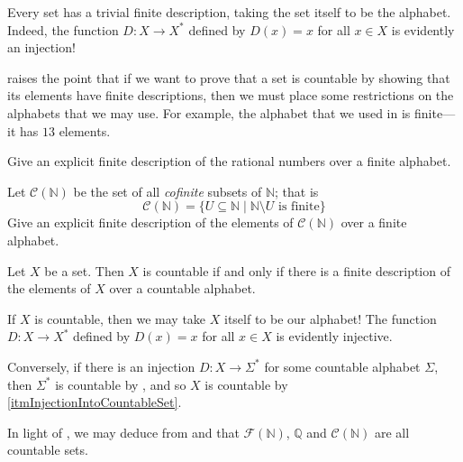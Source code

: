 \begin{example}
\label{exTrivialFiniteDescription}
Every set has a trivial finite description, taking the set itself to be the alphabet. Indeed, the function $D : X \to X^*$ defined by $D(x) = x$ for all $x \in X$ is evidently an injection!
\end{example}

 raises the point that if we want to prove that a set is countable by showing that its elements have finite descriptions, then we must place some restrictions on the alphabets that we may use. For example, the alphabet that we used in  is finite---it has $13$ elements.

\begin{exercise}
\label{exFiniteDescriptionOfQ}
Give an explicit finite description of the rational numbers over a finite alphabet.
\end{exercise}

\begin{exercise}
\label{exFiniteDescriptionOfCofiniteSubsetsOfN}
Let $\mathcal{C}(\mathbb{N})$ be the set of all \textit{cofinite} subsets of $\mathbb{N}$; that is
\[ \mathcal{C}(\mathbb{N}) = \{ U \subseteq \mathbb{N} \mid \mathbb{N} \setminus U \text{ is finite} \} \]
Give an explicit finite description of the elements of $\mathcal{C}(\mathbb{N})$ over a finite alphabet.
\end{exercise}

\begin{theorem}
\label{thmCountableIffFiniteDescription}
Let $X$ be a set. Then $X$ is countable if and only if there is a finite description of the elements of $X$ over a countable alphabet.
\end{theorem}

\begin{cproof}
If $X$ is countable, then we may take $X$ itself to be our alphabet! The function $D : X \to X^*$ defined by $D(x) = x$ for all $x \in X$ is evidently injective.

Conversely, if there is an injection $D : X \to \Sigma^*$ for some countable alphabet $\Sigma$, then $\Sigma^*$ is countable by , and so $X$ is countable by \ref{itmInjectionIntoCountableSet}.
\end{cproof}

\begin{example}
In light of , we may deduce from  and  that $\mathcal{F}(\mathbb{N})$, $\mathbb{Q}$ and $\mathcal{C}(\mathbb{N})$ are all countable sets.
\end{example}

